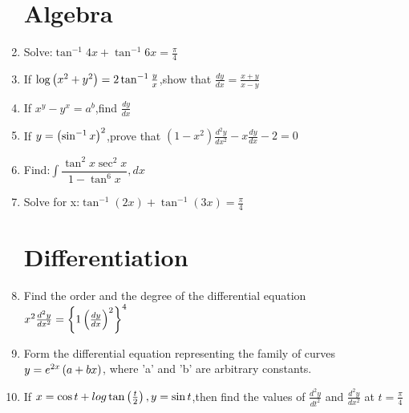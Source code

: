 \documentclass{article}
\begin{document}
\begin{enumerate}
            \section{Algebra}
\item Solve:$\tan^{-1}4x+\tan^{-1}6x=\frac{\pi}{4}$
\item If $\log\left(x^2+y^2\right)=2\tan^{-1}\frac{y}{x}$,show that $\frac{dy}{dx}=\frac{x+y}{x-y}$
\item If $x^y-y^x=a^b$,find $\frac{dy}{dx}$
\item If $y=\left(\sin^{-1}x\right)^2$,prove that $(1-x^2)\frac{d^2y}{dx^2}-x\frac{dy}{dx}-2=0$
\item Find:$\int\dfrac{\tan^2x\sec^2x}{1-\tan^6x},dx$
\item Solve for x:$\tan^{-1}(2x)+\tan^{-1}(3x)=\frac{\pi}{4}$
\section{Differentiation}
	\item Find the order and the degree of the differential equation $x^2\frac{d^2y}{dx^2}=\left\{1\left(\frac{dy}{dx}\right)^2\right\}^4$ 
        \item Form the differential equation representing the family of curves $y = e^{2x}\left(a + bx\right)$, where 'a' and 'b' are arbitrary constants.
     \item If $x=\cos t+log \tan\left(\frac{t    }{2}\right),y=\sin t$,then find the values of     $\frac{d^2y}{dt^2}$ and $\frac{d^2y}{dx^    2}$ at $t=\frac{\pi}{4}$

\end{enumerate}
\end{document}
